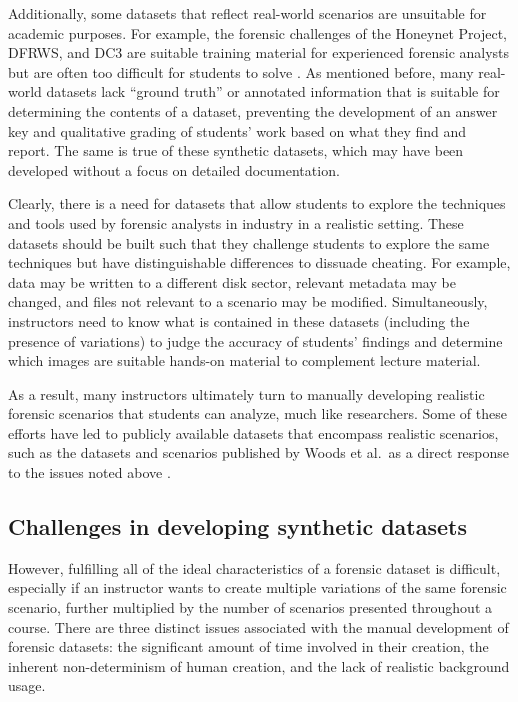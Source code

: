 \documentclass[letterpaper,12pt]{report}
\begin{document}
Additionally, some datasets that reflect real-world scenarios are
unsuitable for academic purposes. For example, the forensic challenges
of the Honeynet Project, DFRWS, and DC3 are suitable training material
for experienced forensic analysts but are often too difficult for
students to solve \cite{woodsCreatingRealisticCorpora2011}. As
mentioned before, many real-world datasets lack ``ground truth'' or
annotated information that is suitable for determining the contents of a
dataset, preventing the development of an answer key and qualitative
grading of students' work based on what they find and report. The same
is true of these synthetic datasets, which may have been developed
without a focus on detailed documentation.

Clearly, there is a need for datasets that allow students to explore the
techniques and tools used by forensic analysts in industry in a
realistic setting. These datasets should be built such that they
challenge students to explore the same techniques but have
distinguishable differences to dissuade cheating. For example, data may
be written to a different disk sector, relevant metadata may be changed,
and files not relevant to a scenario may be modified. Simultaneously,
instructors need to know what is contained in these datasets (including
the presence of variations) to judge the accuracy of students' findings
and determine which images are suitable hands-on material to complement
lecture material.

As a result, many instructors ultimately turn to manually developing
realistic forensic scenarios that students can analyze, much like
researchers. Some of these efforts have led to publicly available
datasets that encompass realistic scenarios, such as the datasets and
scenarios published by Woods et al.~as a direct response to the issues
noted above \cite{woodsCreatingRealisticCorpora2011}.

\subsection{Challenges in developing synthetic
datasets}\label{challenges-in-developing-synthetic-datasets}

However, fulfilling all of the ideal characteristics of a forensic
dataset is difficult, especially if an instructor wants to create
multiple variations of the same forensic scenario, further multiplied by
the number of scenarios presented throughout a course. There are three
distinct issues associated with the manual development of forensic
datasets: the significant amount of time involved in their creation, the
inherent non-determinism of human creation, and the lack of realistic
background usage.
\end{document}
